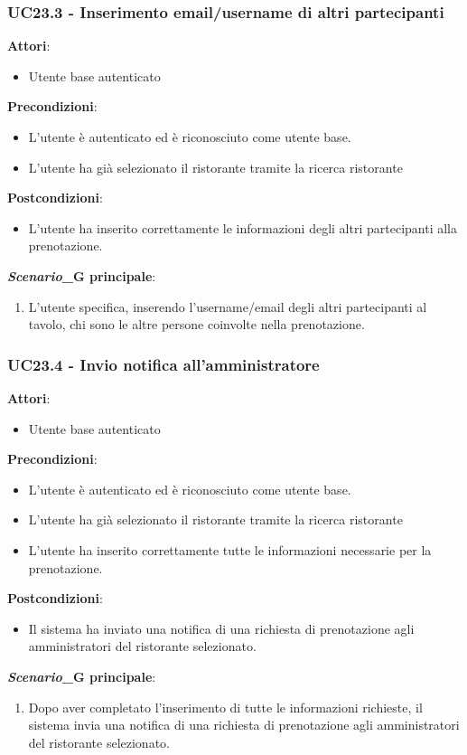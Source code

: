 \subsubsection{UC23.3 - Inserimento email/username di altri partecipanti}\label{usecase:23_3}
\textbf{Attori}:
\begin{itemize}
    \item Utente base autenticato
\end{itemize}
\textbf{Precondizioni}:
\begin{itemize}
    \item L'utente è autenticato ed è riconosciuto come utente base.
    \item L'utente ha già selezionato il ristorante tramite la ricerca ristorante 
\end{itemize}
\textbf{Postcondizioni}:
\begin{itemize}
    \item L'utente ha inserito correttamente le informazioni degli altri partecipanti alla prenotazione.
\end{itemize}
\textbf{\textit{Scenario}_G principale}:
\begin{enumerate}
    \item L'utente specifica, inserendo l'username/email degli altri partecipanti al tavolo, chi sono le altre persone coinvolte nella prenotazione.
\end{enumerate}


\subsubsection{UC23.4 - Invio notifica all'amministratore
}\label{usecase:23_4}
\textbf{Attori}:
\begin{itemize}
    \item Utente base autenticato
\end{itemize}
\textbf{Precondizioni}:
\begin{itemize}
    \item L'utente è autenticato ed è riconosciuto come utente base.
    \item L'utente ha già selezionato il ristorante tramite la ricerca ristorante 
    \item L'utente ha inserito correttamente tutte le informazioni necessarie per la prenotazione.
\end{itemize}
\textbf{Postcondizioni}:
\begin{itemize}
    \item Il sistema ha inviato una notifica di una richiesta di prenotazione agli amministratori del ristorante selezionato.
\end{itemize}
\textbf{\textit{Scenario}_G principale}:
\begin{enumerate}
    \item Dopo aver completato l'inserimento di tutte le informazioni richieste, il sistema invia una notifica di una richiesta di prenotazione agli amministratori del ristorante selezionato.
\end{enumerate}



\newpage


